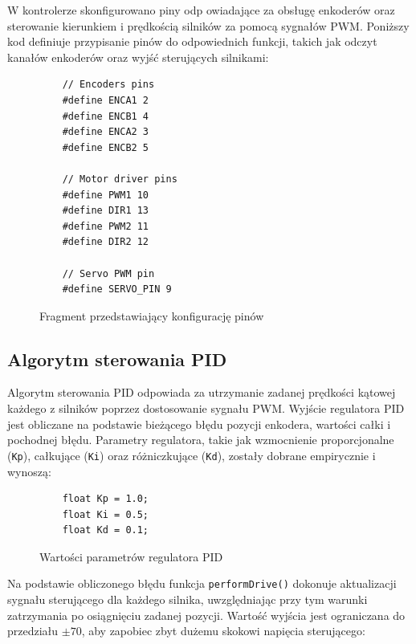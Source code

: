 W kontrolerze skonfigurowano piny odp owiadające za obsługę enkoderów oraz sterowanie kierunkiem i prędkością silników za pomocą sygnałów PWM. Poniższy kod definiuje przypisanie pinów do odpowiednich funkcji, takich jak odczyt kanałów enkoderów oraz wyjść sterujących silnikami:

\begin{figure}[H]
  \centering
  \begin{lstlisting}
    // Encoders pins
    #define ENCA1 2 
    #define ENCB1 4 
    #define ENCA2 3 
    #define ENCB2 5 
    
    // Motor driver pins
    #define PWM1 10
    #define DIR1 13
    #define PWM2 11
    #define DIR2 12
    
    // Servo PWM pin
    #define SERVO_PIN 9
  \end{lstlisting}
  \caption{Fragment przedstawiający konfigurację pinów}
  \label{fig:config}
\end{figure}

\subsection{Algorytm sterowania PID}

Algorytm sterowania PID odpowiada za utrzymanie zadanej prędkości kątowej każdego z silników poprzez dostosowanie sygnału PWM. Wyjście regulatora PID jest obliczane na podstawie bieżącego błędu pozycji enkodera, wartości całki i pochodnej błędu. Parametry regulatora, takie jak wzmocnienie proporcjonalne (\texttt{Kp}), całkujące (\texttt{Ki}) oraz różniczkujące (\texttt{Kd}), zostały dobrane empirycznie i wynoszą:

\begin{figure}[H]
  \centering
  \begin{lstlisting}
    float Kp = 1.0; 
    float Ki = 0.5; 
    float Kd = 0.1; 
  \end{lstlisting}
  \caption{Wartości parametrów regulatora PID}
  \label{fig:config-pid}
  \end{figure}

Na podstawie obliczonego błędu funkcja \texttt{performDrive()} dokonuje aktualizacji sygnału sterującego dla każdego silnika, uwzględniając przy tym warunki zatrzymania po osiągnięciu zadanej pozycji. Wartość wyjścia jest ograniczana do przedziału \( \pm 70 \), aby zapobiec zbyt dużemu skokowi napięcia sterującego:

